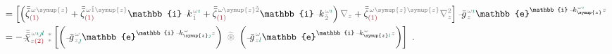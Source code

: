 \begin{subequations}
\begin{align}
	&= \left[ \left( \bar{\bar{\zeta}}^{\;\! \mathcolor{gray}{\omega} \mathcolor{gray}{\symup{z}}}_{\textcolor{Maroon}{(1)}} + \bar{\bar{\zeta}}^{\;\! \mathcolor{gray}{\omega} \mathcolor{gray}{\check{1} \symup{z}}}_{\textcolor{Maroon}{(1)}} \mathbb{i} \xint{\begin{smallmatrix} ~ \\ {}^{}_{\mathcolor{gray}{-}} \\ ~ \end{smallmatrix}}{15}{k}_{\;\! \mathcolor{gray}{\check{1}}}^{\;\! \mathcolor{gray}{\omega} \textcolor{PineGreen}{\imath}} + \bar{\bar{\zeta}}^{\;\! \mathcolor{gray}{\omega} \mathcolor{gray}{\symup{z} \check{2}}}_{\textcolor{Maroon}{(1)}} \mathbb{i} \xint{\begin{smallmatrix} ~ \\ {}^{}_{\mathcolor{gray}{-}} \\ ~ \end{smallmatrix}}{15}{k}_{\;\! \mathcolor{gray}{\check{2}}}^{\;\! \mathcolor{gray}{\omega} \textcolor{PineGreen}{\imath}} \right) \mathcolor{gray}{\nabla_z} + \bar{\bar{\zeta}}^{\;\! \mathcolor{gray}{\omega} \mathcolor{gray}{\symup{z} \symup{z}}}_{\textcolor{Maroon}{(1)}} \mathcolor{gray}{\nabla_z^2} \right] \xint{{}^{}_{\mathcolor{gray}{-}}}{10}{\bar{g}}^{\;\!\mathcolor{gray}{\omega} \textcolor{PineGreen}{\imath}}_{\;\! \mathcolor{gray}{z}} \mathbb{e}^{\mathbb{i} \xint{\begin{smallmatrix} ~ \\ {}^{}_{\mathcolor{gray}{-}} \\ ~ \end{smallmatrix}}{15}{k}_{\symup{z}}^{\;\! \mathcolor{gray}{\omega} \textcolor{PineGreen}{\imath}} \mathcolor{gray}{z}} \label{eq:nonlinear(2)-wave_wkrho-simplify6-V2'} \\
	&= - \xint{{}^{}_{\mathcolor{gray}{-}}}{23}{\bar{\bar{\bar{\chi}}}}^{\;\! \mathcolor{gray}{\omega} \textcolor{PineGreen}{\imath \jmath l}}_{\mathcolor{gray}{z} \textcolor{Maroon}{(2)}} ~{}^{\mathcolor{gray}{*}}_{\mathcolor{gray}{*}} \left[ \left( \xint{{}^{}_{\mathcolor{gray}{-}}}{10}{\bar{g}}^{\;\!\mathcolor{gray}{\omega}}_{\;\! \mathcolor{gray}{z} \textcolor{PineGreen}{\jmath}} \mathbb{e}^{\mathbb{i} \xint{\begin{smallmatrix} ~ \\ {}^{}_{\mathcolor{gray}{-}} \\ ~ \end{smallmatrix}}{15}{k}_{\symup{z} \textcolor{PineGreen}{\jmath}}^{\;\! \mathcolor{gray}{\omega}} \mathcolor{gray}{z}} \right) ~\mathcolor{gray}{\widetilde \circledast}~ \left( \xint{{}^{}_{\mathcolor{gray}{-}}}{10}{\bar{g}}^{\;\!\mathcolor{gray}{\omega}}_{\;\! \mathcolor{gray}{z} \textcolor{PineGreen}{l}} \mathbb{e}^{\mathbb{i} \xint{\begin{smallmatrix} ~ \\ {}^{}_{\mathcolor{gray}{-}} \\ ~ \end{smallmatrix}}{15}{k}_{\symup{z} \textcolor{PineGreen}{l}}^{\;\! \mathcolor{gray}{\omega}} \mathcolor{gray}{z}} \right) \right] \label{eq:nonlinear(2)-wave_wkrho-simplify6-V3'} ~.
\end{align}
\end{subequations}

